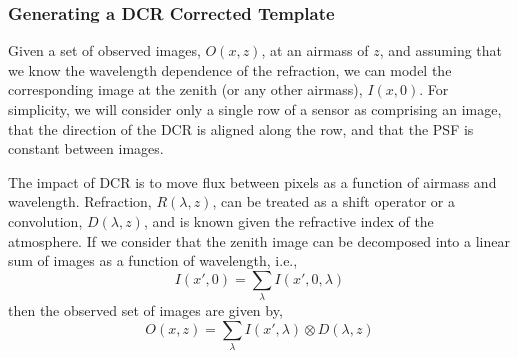 		

\subsubsection{Generating a DCR Corrected Template}

Given a set of observed images, $O(x, z)$, at an airmass of $z$, and
assuming that we know the wavelength dependence of the refraction, we
can model the corresponding image at the zenith (or any other
airmass), $I(x, 0)$. For simplicity, we will consider only a single
row of a sensor as comprising an image, that the direction of the DCR
is aligned along the row, and that the PSF is constant between
images. 

The impact of DCR is to move flux between pixels as a function of airmass and wavelength. Refraction, $R(\lambda, z)$, can be treated as a shift operator or a convolution, $D(\lambda, z)$, and is known given the refractive index of the atmosphere.  If we consider that the zenith image can be decomposed into a linear sum of images as a function of wavelength, i.e.,
\begin{equation}
I(x', 0) = \sum_\lambda I(x', 0, \lambda) 
\end{equation}
then the observed set of images are given by,
\begin{equation}
O(x, z) = \sum_\lambda I(x',\lambda) \otimes D(\lambda, z) 
\label{eq:convDCR}
\end{equation}

